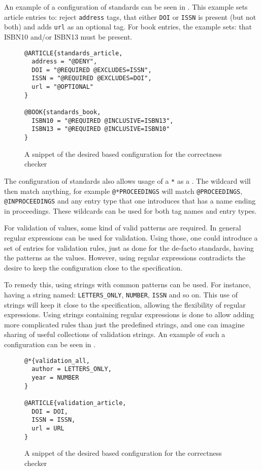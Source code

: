 An example of a configuration of standards can be seen in
.  This example sets article
entries to: reject \texttt{address} tags, that either \texttt{DOI} or
\texttt{ISSN} is present (but not both) and adds \texttt{url} as an
optional tag.  For book entries, the example sets: that ISBN10 and/or
ISBN13 must be present.

\begin{figure}
  \centering
\begin{verbatim}
@ARTICLE{standards_article,
  address = "@DENY",
  DOI = "@REQUIRED @EXCLUDES=ISSN",
  ISSN = "@REQUIRED @EXCLUDES=DOI",
  url = "@OPTIONAL"
}

@BOOK{standards_book,
  ISBN10 = "@REQUIRED @INCLUSIVE=ISBN13",
  ISBN13 = "@REQUIRED @INCLUSIVE=ISBN10"
}
\end{verbatim}
  \caption{A snippet of the desired {\bibtex} based configuration for
    the correctness checker}
  \label{fig:analyzing_standards_config}
\end{figure}

The configuration of standards also allows usage of a \texttt{*} as a
.  The wildcard will then match anything, for example
\texttt{@*PROCEEDINGS} will match \texttt{@PROCEEDINGS},
\texttt{@INPROCEEDINGS} and any entry type that one introduces that has
a name ending in proceedings.  These wildcards can be used for both
tag names and entry types.

For validation of values, some kind of valid patterns are required.
In general regular expressions can be used for validation.  Using
those, one could introduce a set of entries for validation rules, just
as done for the de-facto standards, having the patterns as the values.
However, using regular expressions contradicts the desire to keep the
configuration close to the {\bibtex} specification.

To remedy this, using strings with common patterns can be used.  For
instance, having a string named: \texttt{LETTERS\_ONLY},
\texttt{NUMBER}, \texttt{ISSN} and so on.  This use of strings will
keep it close to the {\bibtex} specification, allowing the flexibility
of regular expressions.  Using strings containing regular expressions
is done to allow adding more complicated rules than just the
predefined strings, and one can imagine sharing of useful collections
of validation strings.  An example of such a configuration can be seen
in .

\begin{figure}
  \centering
\begin{verbatim}
@*{validation_all,
  author = LETTERS_ONLY,
  year = NUMBER
}

@ARTICLE{validation_article,
  DOI = DOI,
  ISSN = ISSN,
  url = URL
}
\end{verbatim}
  \caption{A snippet of the desired {\bibtex} based configuration for
    the correctness checker}
  \label{fig:analyzing_validation_config}
\end{figure}

